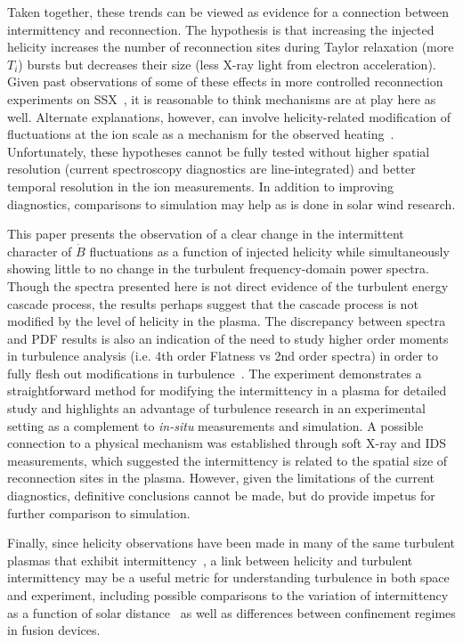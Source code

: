 \documentclass[aps,prl,amsmath,amssymb,reprint,superscriptaddress]{revtex4-1} %
\begin{document}
Taken together, these trends can be viewed as evidence for a connection between intermittency and reconnection. The hypothesis is that increasing the injected helicity increases the number of reconnection sites during Taylor relaxation (more $T_{i}$) bursts but decreases their size (less X-ray light from electron acceleration). Given past observations of some of these effects in more controlled reconnection experiments on SSX~\cite{brown12}, it is reasonable to think mechanisms are at play here as well. Alternate explanations, however, can involve helicity-related modification of fluctuations at the ion scale as a mechanism for the observed heating~\cite{wu13,osman11}. Unfortunately, these hypotheses cannot be fully tested without higher spatial resolution (current spectroscopy diagnostics are line-integrated) and better temporal resolution in the ion measurements. In addition to improving diagnostics, comparisons to simulation may help as is done in solar wind research.

This paper presents the observation of a clear change in the intermittent character of $\dot{B}$ fluctuations as a function of injected helicity while simultaneously showing little to no change in the turbulent frequency-domain power spectra. Though the spectra presented here is not direct evidence of the turbulent energy cascade process, the results perhaps suggest that the cascade process is not modified by the level of helicity in the plasma. The discrepancy between spectra and PDF results is also an indication of the need to study higher order moments in turbulence analysis (i.e. 4th order Flatness vs 2nd order spectra) in order to fully flesh out modifications in turbulence~\cite{matthaeusVelli11}. The experiment demonstrates a straightforward method for modifying the intermittency in a plasma for detailed study and highlights an advantage of turbulence research in an experimental setting as a complement to {\it in-situ} measurements and simulation. A possible connection to a physical mechanism was established through soft X-ray and IDS measurements, which suggested the intermittency is related to the spatial size of reconnection sites in the plasma. However, given the limitations of the current diagnostics, definitive conclusions cannot be made, but do provide impetus for further comparison to simulation.

Finally, since helicity observations have been made in many of the same turbulent plasmas that exhibit intermittency~\cite{goldstein94, ji95, telloni12}, a link between helicity and turbulent intermittency may be a useful metric for understanding turbulence in both space and experiment, including possible comparisons to the variation of intermittency as a function of solar distance~\cite{greco12} as well as differences between confinement regimes in fusion devices.
\end{document}
